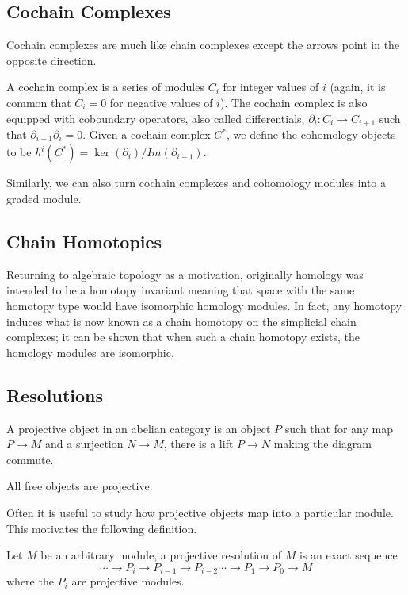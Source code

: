 \subsection{Cochain Complexes}
Cochain complexes are much like chain complexes except the arrows point in the
opposite direction.
\begin{definition} A cochain complex is a series of modules $C_i$ for integer
values of $i$ (again, it is common that $C_i=0$ for negative values of $i$). The
cochain complex is also equipped with coboundary operators, also called
differentials, $\partial_i:C_i\rightarrow C_{i+1}$ such that
$\partial_{i+1}\partial_i=0$. Given a cochain complex $C^*$, we define the
cohomology objects to be $h^i(C^*)=\ker(\partial_i)/Im(\partial_{i-1})$.
\end{definition}
Similarly, we can also turn cochain complexes and cohomology modules into a
graded module.

\subsection{Chain Homotopies}
Returning to algebraic topology as a motivation, originally homology was
intended to be a homotopy invariant meaning that space with the same homotopy
type would have isomorphic homology modules. In fact, any homotopy induces what
is now known as a chain homotopy on the simplicial chain complexes; it can be
shown that when such a chain homotopy exists, the homology modules are
isomorphic.

\subsection{Resolutions}


\begin{definition} A projective object in an abelian category is an object $P$
such that for any map $P\rightarrow M$ and a surjection $N\rightarrow M$, there
is a lift $P\rightarrow N$ making the diagram commute. \end{definition}
\begin{example} All free objects are projective. \end{example}

Often it is useful to study how projective objects map into a particular module.
This motivates the following definition.


\begin{definition} Let $M$ be an arbitrary module, a projective resolution of
$M$ is an exact sequence
\begin{equation} \cdots\rightarrow P_i\rightarrow P_{i-1}\rightarrow
P_{i-2}\cdots\rightarrow P_1\rightarrow P_0\rightarrow M \end{equation} where
the $P_i$ are projective modules. \end{definition}


